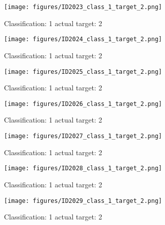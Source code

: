 \begin{figure}[h!]
\begin{center}
\texttt{[image: figures/ID2023\_class\_1\_target\_2.png]}
\end{center}
\caption{ Classification: 1 actual target: 2}
\label{fig:ID2023_class_1_target_2}
\end{figure}
\begin{figure}[h!]
\begin{center}
\texttt{[image: figures/ID2024\_class\_1\_target\_2.png]}
\end{center}
\caption{ Classification: 1 actual target: 2}
\label{fig:ID2024_class_1_target_2}
\end{figure}
\begin{figure}[h!]
\begin{center}
\texttt{[image: figures/ID2025\_class\_1\_target\_2.png]}
\end{center}
\caption{ Classification: 1 actual target: 2}
\label{fig:ID2025_class_1_target_2}
\end{figure}
\begin{figure}[h!]
\begin{center}
\texttt{[image: figures/ID2026\_class\_1\_target\_2.png]}
\end{center}
\caption{ Classification: 1 actual target: 2}
\label{fig:ID2026_class_1_target_2}
\end{figure}
\begin{figure}[h!]
\begin{center}
\texttt{[image: figures/ID2027\_class\_1\_target\_2.png]}
\end{center}
\caption{ Classification: 1 actual target: 2}
\label{fig:ID2027_class_1_target_2}
\end{figure}
\begin{figure}[h!]
\begin{center}
\texttt{[image: figures/ID2028\_class\_1\_target\_2.png]}
\end{center}
\caption{ Classification: 1 actual target: 2}
\label{fig:ID2028_class_1_target_2}
\end{figure}
\begin{figure}[h!]
\begin{center}
\texttt{[image: figures/ID2029\_class\_1\_target\_2.png]}
\end{center}
\caption{ Classification: 1 actual target: 2}
\label{fig:ID2029_class_1_target_2}
\end{figure}

